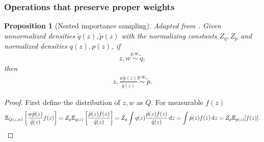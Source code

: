\documentclass[anonymous=false, %
               format=acmsmall, %
               review=true, %
               screen=true, %
               nonacm=true]{acmart}
\newtheorem{proposition}{Proposition}
\theoremstyle{definition}
\newcommand{\pw}{\overset{\text{p.w.}}{\sim}
}
\begin{document}
\subsubsection{Operations that preserve proper weights}


\begin{proposition}[Nested importance sampling]
    Adapted from \cite[Algorithm 1]{naesseth2015nested}.
    Given unnormalized densities $\tilde q(z), \tilde p(z)$ with the normalizing constants $Z_q, Z_p$ and normalized densities $q(z), p(z)$, if 
    \begin{align}
        z, w \pw \tilde q, \label{eq:1}
    \end{align}
    then
    \begin{align*}
        z, \frac{w\tilde p(z)}{\tilde q(z)} \pw \tilde p.
    \end{align*}
\end{proposition}
\begin{proof}
    First define the distribution of $z, w$ as $Q$.
    For measurable $f(z)$
    \begin{align*}
        \mathbb{E}_{Q(z, w)}\left[\frac{w\tilde p(z)}{\tilde q(z)} f(z)\right] 
        = Z_q \mathbb{E}_{q(z)}\left[\frac{\tilde p(z) f(z)}{\tilde q(z)}\right]
        = Z_q \int q(z) \frac{\tilde p(z) f(z)}{\tilde q(z)} \,\mathrm dz
        = \int \tilde p\textbf{}(z) f(z) \,\mathrm dz
        = Z_p \mathbb{E}_{p(z)}[f(z)].
    \end{align*}
\end{proof}
\end{document}

